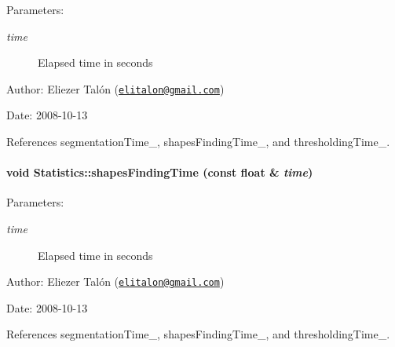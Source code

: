 \begin{Desc}
\item[Parameters:]
\begin{description}
\item[{\em time}]Elapsed time in seconds\end{description}
\end{Desc}
\begin{Desc}
\item[Author:]Eliezer Talón (\href{mailto:elitalon@gmail.com}{\tt elitalon@gmail.com}) \end{Desc}
\begin{Desc}
\item[Date:]2008-10-13 \end{Desc}


References segmentationTime\_\-, shapesFindingTime\_\-, and thresholdingTime\_\-.\hypertarget{class_statistics_e380b6d86bb2feeaabba147f731aac73}{
\paragraph[shapesFindingTime]{\setlength{\rightskip}{0pt plus 5cm}void Statistics::shapesFindingTime (const float \& {\em time})}\hfill}
\label{class_statistics_e380b6d86bb2feeaabba147f731aac73}


\begin{Desc}
\item[Parameters:]
\begin{description}
\item[{\em time}]Elapsed time in seconds\end{description}
\end{Desc}
\begin{Desc}
\item[Author:]Eliezer Talón (\href{mailto:elitalon@gmail.com}{\tt elitalon@gmail.com}) \end{Desc}
\begin{Desc}
\item[Date:]2008-10-13 \end{Desc}


References segmentationTime\_\-, shapesFindingTime\_\-, and thresholdingTime\_\-.